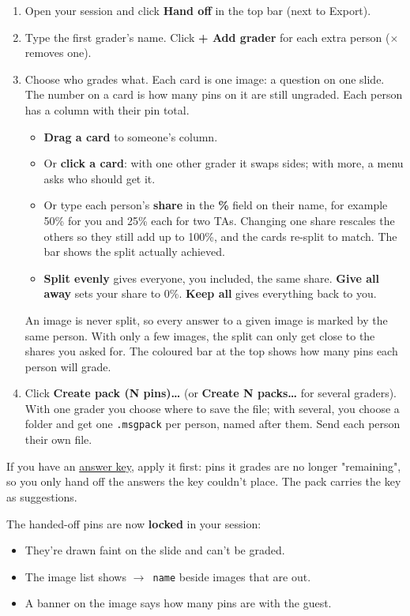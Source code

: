 \begin{enumerate}[topsep=2pt, itemsep=2pt]
\item Open your session and click \textbf{Hand off} in the top bar (next to Export).
\item Type the first grader's name. Click \textbf{+ Add grader} for each extra person (\ensuremath{\times} removes one).
\item Choose who grades what. Each card is one image: a question on one slide. The number on a card is how many pins on it are still ungraded. Each person has a column with their pin total.
\begin{itemize}[topsep=1pt]
\item \textbf{Drag a card} to someone's column.
\item Or \textbf{click a card}: with one other grader it swaps sides; with more, a menu asks who should get it.
\item Or type each person's \textbf{share} in the \textbf{\%} field on their name, for example 50\% for you and 25\% each for two TAs. Changing one share rescales the others so they still add up to 100\%, and the cards re-split to match. The bar shows the split actually achieved.
\item \textbf{Split evenly} gives everyone, you included, the same share. \textbf{Give all away} sets your share to 0\%. \textbf{Keep all} gives everything back to you.
\end{itemize}

An image is never split, so every answer to a given image is marked by the same person. With only a few images, the split can only get close to the shares you asked for. The coloured bar at the top shows how many pins each person will grade.
\item Click \textbf{Create pack (N pins)\ldots{}} (or \textbf{Create N packs\ldots{}} for several graders). With one grader you choose where to save the file; with several, you choose a folder and get one \texttt{.msgpack} per person, named after them. Send each person their own file.
\end{enumerate}

If you have an \hyperref[sec:answer-key]{answer key}, apply it first: pins it grades are no longer "remaining", so you only hand off the answers the key couldn't place. The pack carries the key as suggestions.

The handed-off pins are now \textbf{locked} in your session:

\begin{itemize}[topsep=2pt, itemsep=2pt]
\item They're drawn faint on the slide and can't be graded.
\item The image list shows \texttt{\ensuremath{\rightarrow} name} beside images that are out.
\item A banner on the image says how many pins are with the guest.
\end{itemize}

